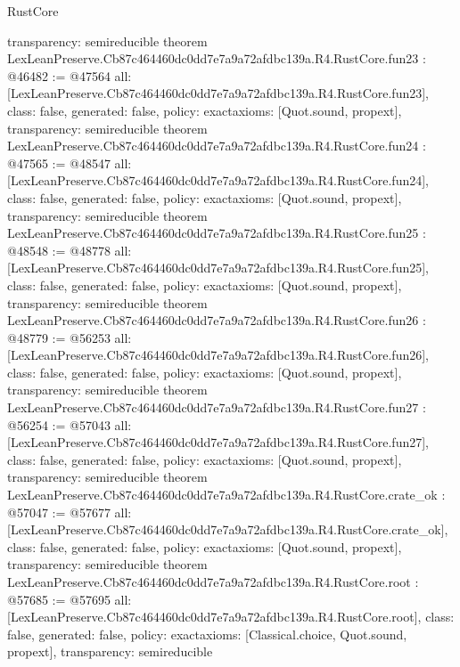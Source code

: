\begin{lexlean}{RustCore}
\begin{coremodule}
{  transparency: semireducible
}
theorem LexLeanPreserve.Cb87c464460dc0dd7e7a9a72afdbc139a.R4.RustCore.fun23 : @46482 := @47564 {
  all: [LexLeanPreserve.Cb87c464460dc0dd7e7a9a72afdbc139a.R4.RustCore.fun23],
  class: false,
  generated: false,
  policy: exact{axioms: [Quot.sound, propext]},
  transparency: semireducible
}
theorem LexLeanPreserve.Cb87c464460dc0dd7e7a9a72afdbc139a.R4.RustCore.fun24 : @47565 := @48547 {
  all: [LexLeanPreserve.Cb87c464460dc0dd7e7a9a72afdbc139a.R4.RustCore.fun24],
  class: false,
  generated: false,
  policy: exact{axioms: [Quot.sound, propext]},
  transparency: semireducible
}
theorem LexLeanPreserve.Cb87c464460dc0dd7e7a9a72afdbc139a.R4.RustCore.fun25 : @48548 := @48778 {
  all: [LexLeanPreserve.Cb87c464460dc0dd7e7a9a72afdbc139a.R4.RustCore.fun25],
  class: false,
  generated: false,
  policy: exact{axioms: [Quot.sound, propext]},
  transparency: semireducible
}
theorem LexLeanPreserve.Cb87c464460dc0dd7e7a9a72afdbc139a.R4.RustCore.fun26 : @48779 := @56253 {
  all: [LexLeanPreserve.Cb87c464460dc0dd7e7a9a72afdbc139a.R4.RustCore.fun26],
  class: false,
  generated: false,
  policy: exact{axioms: [Quot.sound, propext]},
  transparency: semireducible
}
theorem LexLeanPreserve.Cb87c464460dc0dd7e7a9a72afdbc139a.R4.RustCore.fun27 : @56254 := @57043 {
  all: [LexLeanPreserve.Cb87c464460dc0dd7e7a9a72afdbc139a.R4.RustCore.fun27],
  class: false,
  generated: false,
  policy: exact{axioms: [Quot.sound, propext]},
  transparency: semireducible
}
theorem LexLeanPreserve.Cb87c464460dc0dd7e7a9a72afdbc139a.R4.RustCore.crate_ok : @57047 := @57677 {
  all: [LexLeanPreserve.Cb87c464460dc0dd7e7a9a72afdbc139a.R4.RustCore.crate_ok],
  class: false,
  generated: false,
  policy: exact{axioms: [Quot.sound, propext]},
  transparency: semireducible
}
theorem LexLeanPreserve.Cb87c464460dc0dd7e7a9a72afdbc139a.R4.RustCore.root : @57685 := @57695 {
  all: [LexLeanPreserve.Cb87c464460dc0dd7e7a9a72afdbc139a.R4.RustCore.root],
  class: false,
  generated: false,
  policy: exact{axioms: [Classical.choice, Quot.sound, propext]},
  transparency: semireducible
}


\end{coremodule}
\end{lexlean}
